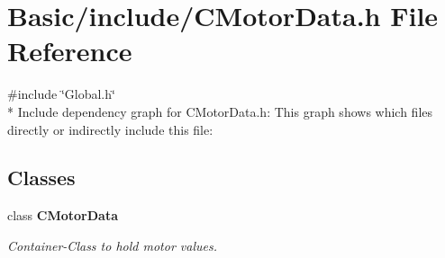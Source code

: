 \section{Basic/include/\-C\-Motor\-Data.h File Reference}
\label{CMotorData_8h}
{\ttfamily \#include \char`\"{}Global.\-h\char`\"{}}\\*
Include dependency graph for C\-Motor\-Data.\-h\-:
This graph shows which files directly or indirectly include this file\-:
\subsection*{Classes}
\begin{DoxyCompactItemize}
\item 
class {\bf C\-Motor\-Data}
\begin{DoxyCompactList}\small\item\em Container-\/\-Class to hold motor values. \end{DoxyCompactList}\end{DoxyCompactItemize}
